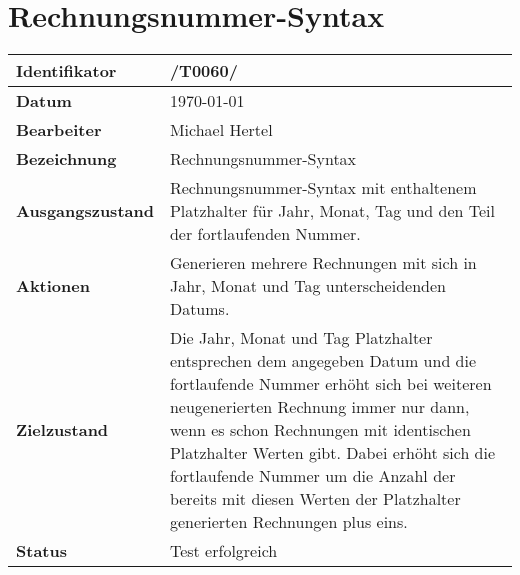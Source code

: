 
\section{Rechnungsnummer-Syntax}

\renewcommand{\arraystretch}{1.5}

\begin{center}
 \begin{tabular}{|p{}|p{}|}
	\hline
	\textbf{Identifikator}  & /T0060/ \\
	\hline
	\textbf{Datum} & \today \\
	\hline
	\textbf{Bearbeiter} & Michael Hertel \\
	\hline
	\textbf{Bezeichnung} & Rechnungsnummer-Syntax \\
	\hline
	\textbf{Ausgangszustand} & 
		Rechnungsnummer-Syntax mit enthaltenem Platzhalter für Jahr, Monat, Tag und den Teil der fortlaufenden Nummer. \\
	\hline
	\textbf{Aktionen} & 
		Generieren mehrere Rechnungen mit sich in Jahr, Monat und Tag unterscheidenden Datums. \\
	\hline
	\textbf{Zielzustand} & 
		Die Jahr, Monat und Tag Platzhalter entsprechen dem angegeben Datum und die fortlaufende Nummer erhöht sich bei weiteren neugenerierten Rechnung immer nur dann, wenn es schon Rechnungen mit identischen Platzhalter Werten gibt. Dabei erhöht sich die fortlaufende Nummer um die Anzahl der bereits mit diesen Werten der Platzhalter generierten Rechnungen plus eins. \\
	\hline
	\textbf{Status} & Test erfolgreich \\
	\hline
 \end{tabular}
\end{center}
